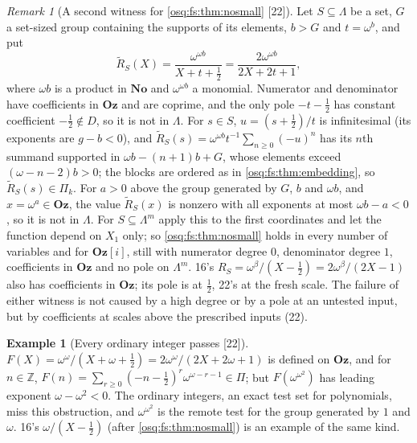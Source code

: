 \documentclass[11pt,letterpaper]{article}
\numberwithin{equation}{section}
\theoremstyle{definition}
\newtheorem{example}[example]{Example}
\theoremstyle{remark}
\newtheorem{remark}[remark]{Remark}
\theoremstyle{plain}
\newcommand{\No}{\mathbf{No}}
\newcommand{\Oz}{\mathbf{Oz}}
\newcommand{\GOz}{\Oz[i]}
\newcommand{\Z}{\mathbb Z}
\newcommand{\src}[1]{\textup{\textsf{[#1]}}}
\begin{document}
\begin{remark}[A second witness for \cref{osq:fs:thm:nosmall} \src{22}]\label{osq:ft:rem:deceiver}
Let $S\subseteq\Lambda$ be a set, $G$ a set-sized group containing the supports of its elements, $b>G$ and $t=\omega^b$, and put
\begin{equation}\label{osq:ft:eq:deceiver}
 \widetilde R_S(X)=\frac{\omega^{\omega b}}{X+t+\frac12}=\frac{2\omega^{\omega b}}{2X+2t+1},
\end{equation}
where $\omega b$ is a product in $\No$ and $\omega^{\omega b}$ a monomial. Numerator and denominator have coefficients in $\Oz$ and are coprime, and the
only pole $-t-\frac12$ has constant coefficient $-\frac12\notin D$, so it is not in $\Lambda$. For $s\in S$, $u=(s+\frac12)/t$ is infinitesimal (its
exponents are $g-b<0$), and $\widetilde R_S(s)=\omega^{\omega b}t^{-1}\sum_{n\ge0}(-u)^n$ has its $n$th summand supported in $\omega b-(n+1)b+G$, whose
elements exceed $(\omega-n-2)b>0$; the blocks are ordered as in \cref{osq:fs:thm:embedding}, so $\widetilde R_S(s)\in\Pi_k$. For $a>0$ above the group
generated by $G$, $b$ and $\omega b$, and $x=\omega^a\in\Oz$, the value $\widetilde R_S(x)$ is nonzero with all exponents at most $\omega b-a<0$, so it
is not in $\Lambda$. For $S\subseteq\Lambda^m$ apply this to the first coordinates and let the function depend on $X_1$ only; so
\cref{osq:fs:thm:nosmall} holds in every number of variables and for $\GOz$, still with numerator degree $0$, denominator degree $1$, coefficients in $\Oz$
and no pole on $\Lambda^m$. 16's $R_S=\omega^\beta/(X-\frac12)=2\omega^\beta/(2X-1)$ also has coefficients in $\Oz$; its pole is at $\frac12$, 22's at
the fresh scale. The failure of either witness is not caused by a high degree or by a pole at an untested input, but by coefficients at scales above the
prescribed inputs (22).
\end{remark}

\begin{example}[Every ordinary integer passes \src{22}]\label{osq:ft:ex:integers}
$F(X)=\omega^\omega/(X+\omega+\frac12)=2\omega^\omega/(2X+2\omega+1)$ is defined on $\Oz$, and for $n\in\Z$,
$F(n)=\sum_{r\ge0}(-n-\frac12)^r\omega^{\omega-r-1}\in\Pi$; but $F(\omega^{\omega^2})$ has leading exponent $\omega-\omega^2<0$. The ordinary integers,
an exact test set for polynomials, miss this obstruction, and $\omega^{\omega^2}$ is the remote test for the group generated by $1$ and $\omega$. 16's
$\omega/(X-\frac12)$ (after \cref{osq:fs:thm:nosmall}) is an example of the same kind.
\end{example}
\end{document}
